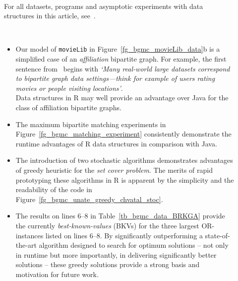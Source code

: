 \begin{description}
\item[]~\
\\
For all datasets, programs and asymptotic experiments with data structures
in this article, see~\cite{OPUS-github-rBedPlus-bgmc}.

\item[]~\
\begin{itemize}
\item
Our model of {\tt movieLib} in 
Figure~\ref{fg_bgmc_movieLib_data}b
is a simplified case of an {\it affiliation} bipartite graph.
For example, the first sentence
from~\cite{OPUS-affiliation-2021-Springer-Stankova-bg_classification} 
begins with
{\small\it `Many real-world large datasets correspond to bipartite graph 
data settings—think for example of users rating movies or people visiting locations'}.
\\
Data structures in R may well provide an
advantage over Java for the class of affiliation bipartite graphs.

\item
The maximum bipartite matching experiments in
Figure~\ref{fg_bgmc_matching_experiment}
consistently demonstrate the runtime advantages of R
data structures in comparison with Java.

\item
The introduction of two stochastic algorithms demonstrates
advantages of greedy heuristic for the {\it set cover problem}.
The merits of rapid prototyping these algorithms in R is apparent
by the simplicity and the readability of the code 
in Figure~\ref{fg_bgmc_unate_greedy_chvatal_stoc}.

\item
The results on lines 6--8 in Table~\ref{tb_bgmc_data_BRKGA} 
provide the currently {\it best-known-values} (BKVs) for the
three largest OR-instances listed on lines 6--8. 
By significantly outperforming
a state-of-the-art algorithm designed to search for optimum solutions -- 
not only in runtime but more importantly, in delivering 
significantly better solutions -- these greedy solutions
provide a strong basis and motivation for future work.


\end{itemize}


\end{description}
